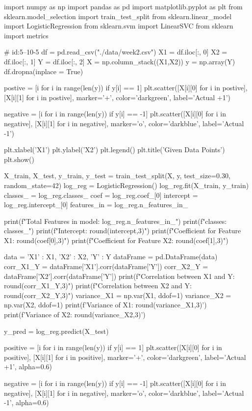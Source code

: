 \documentclass{article}
\begin{document}
\begin{python}
import numpy as np
import pandas as pd
import matplotlib.pyplot as plt
from sklearn.model_selection import train_test_split
from sklearn.linear_model import LogisticRegression
from sklearn.svm import LinearSVC
from sklearn import metrics

# id:5--10-5 
df = pd.read_csv("./data/week2.csv")
X1 = df.iloc[:, 0]
X2 = df.iloc[:, 1]
Y = df.iloc[:, 2]
X = np.column_stack((X1,X2))
y = np.array(Y)
df.dropna(inplace = True)

postive = [i for i in range(len(y)) if y[i] == 1]
plt.scatter([X[i][0] for i in postive], [X[i][1] for i in postive], marker='+', color='darkgreen', label='Actual +1')

negative = [i for i in range(len(y)) if y[i] == -1]
plt.scatter([X[i][0] for i in negative], [X[i][1] for i in negative], marker='o', color='darkblue', label='Actual -1')

plt.xlabel('X1')
plt.ylabel('X2')
plt.legend()
plt.title('Given Data Points')
plt.show()

X_train, X_test, y_train, y_test = train_test_split(X, y, test_size=0.30, random_state=42)
log_reg = LogisticRegression()
log_reg.fit(X_train, y_train)
classes_ = log_reg.classes_
coef = log_reg.coef_[0]
intercept = log_reg.intercept_[0] 
features_in = log_reg.n_features_in_

print(f"Total Features in model: {log_reg.n_features_in_}")
print(f"classes: {classes_}")
print(f"Intercept: {round(intercept,3)}")
print(f"Coefficient for Feature X1: {round(coef[0],3)}")
print(f"Coefficient for Feature X2: {round(coef[1],3)}")

data = {
    'X1' : X1,
    'X2' : X2,
    'Y' : Y
}
dataFrame = pd.DataFrame(data)
corr_X1_Y = dataFrame['X1'].corr(dataFrame['Y'])
corr_X2_Y = dataFrame['X2'].corr(dataFrame['Y'])
print(f"Correlation between X1 and Y: {round(corr_X1_Y,3)}")
print(f"Correlation between X2 and Y: {round(corr_X2_Y,3)}")
variance_X1 = np.var(X1, ddof=1)
variance_X2 = np.var(X2, ddof=1)
print(f'Variance of X1: {round(variance_X1,3)}')
print(f'Variance of X2: {round(variance_X2,3)}')

y_pred = log_reg.predict(X_test)

positive = [i for i in range(len(y)) if y[i] == 1]
plt.scatter([X[i][0] for i in positive], [X[i][1] for i in positive], marker='+', color='darkgreen', label='Actual +1', alpha=0.6)

negative = [i for i in range(len(y)) if y[i] == -1]
plt.scatter([X[i][0] for i in negative], [X[i][1] for i in negative], marker='o', color='darkblue', label='Actual -1', alpha=0.6)


\end{python}
\end{document}
